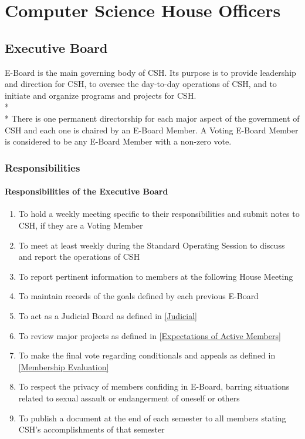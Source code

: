 \documentclass{article}
\newcommand{\article}[1]{\section{#1} \label{#1}}
\newcommand{\asection}[1]{\subsection{#1} \label{#1}}
\newcommand{\asubsection}[1]{\subsubsection{#1} \label{#1}}
\newcommand{\asubsubsection}[1]{\paragraph{#1} \label{#1}}
\begin{document}
\article{Computer Science House Officers}

\asection{Executive Board}
E-Board is the main governing body of CSH.
Its purpose is to provide leadership and direction for CSH, to oversee the day-to-day operations of CSH, and to initiate and organize programs and projects for CSH.
\\*\\*
There is one permanent directorship for each major aspect of the government of CSH and each one is chaired by an E-Board Member.
A Voting E-Board Member is considered to be any E-Board Member with a non-zero vote. %

\asubsection{Responsibilities}
\renewcommand{\theenumi}{\alph{enumi}} %

\asubsubsection{Responsibilities of the Executive Board}
\renewcommand{\theenumi}{\arabic{enumi}} %
\begin{enumerate}
	\item To hold a weekly meeting specific to their responsibilities and submit notes to CSH, if they are a Voting Member
	\item To meet at least weekly during the Standard Operating Session to discuss and report the operations of CSH
	\item To report pertinent information to members at the following House Meeting
	\item To maintain records of the goals defined by each previous E-Board
	\item To act as a Judicial Board as defined in \ref{Judicial}
	\item To review major projects as defined in \ref{Expectations of Active Members}
	\item To make the final vote regarding conditionals and appeals as defined in \ref{Membership Evaluation}
	\item To respect the privacy of members confiding in E-Board, barring situations related to sexual assault or endangerment of oneself or others
	\item To publish a document at the end of each semester to all members stating CSH's accomplishments of that semester
\end{enumerate}
\end{document}
